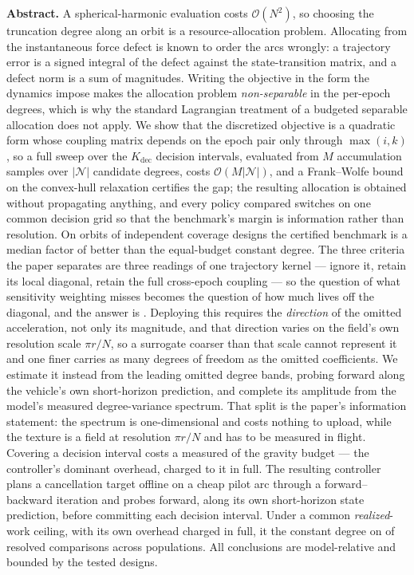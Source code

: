 \vspace{10pt}
\begin{center}
\begin{minipage}{0.92\textwidth}
  \small
  \textbf{Abstract.}
  A spherical-harmonic evaluation costs $\mathcal{O}(N^2)$, so choosing the
  truncation degree along an orbit is a resource-allocation problem. Allocating
  from the instantaneous force defect is known to order the arcs wrongly: a
  trajectory error is a signed integral of the defect against the
  state-transition matrix, and a defect norm is a sum of magnitudes. Writing
  the objective in the form the dynamics impose makes the allocation problem
  \emph{non-separable} in the per-epoch degrees, which is why the standard
  Lagrangian treatment of a budgeted separable allocation does not apply. We
  show that the discretized objective is a quadratic form whose coupling matrix
  depends on the epoch pair only through $\max(i,k)$, so a full sweep over the
  $K_{\mathrm{dec}}$ decision intervals, evaluated from $M$ accumulation
  samples over $\lvert\mathcal{N}\rvert$ candidate degrees, costs
  $\mathcal{O}(M\lvert\mathcal{N}\rvert)$, and a Frank--Wolfe bound on the
  convex-hull relaxation certifies the gap; the resulting allocation is
  obtained without propagating anything, and every policy compared switches on
  one common decision grid so that the benchmark's margin is information rather
  than resolution. On  orbits of  independent coverage designs
  the certified benchmark is a median factor of  better than the
  equal-budget constant degree. The three criteria the paper separates are
  three readings of one trajectory kernel --- ignore it, retain its local
  diagonal, retain the full cross-epoch coupling --- so the question of what
  sensitivity weighting misses becomes the question of how much lives off the
  diagonal, and the answer is .
  Deploying this requires the \emph{direction} of the omitted acceleration, not
  only its magnitude, and that direction varies on the field's own resolution
  scale $\pi r/N$, so a surrogate coarser than that scale cannot represent it
  and one finer carries as many degrees of freedom as the omitted coefficients.
  We estimate it instead from the leading omitted degree bands, probing forward
  along the vehicle's own short-horizon prediction, and complete its amplitude
  from the model's measured degree-variance spectrum. That split is the paper's
  information statement: the spectrum is one-dimensional and costs nothing to
  upload, while the texture is a field at resolution $\pi r/N$ and has to be
  measured in flight. Covering a decision interval costs a measured  of
  the gravity budget --- the controller's dominant overhead, charged to it in
  full. The
  resulting controller plans a cancellation target offline on a cheap pilot arc
  through a forward--backward iteration and probes forward, along its own
  short-horizon state prediction, before committing each decision interval. Under a
  common \emph{realized}-work ceiling, with its own overhead charged in full,
  it  the constant
  degree on  of  resolved comparisons across  populations.
  All conclusions are model-relative and bounded by the tested designs.


\end{minipage}
\end{center}
